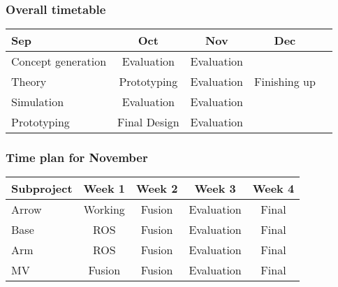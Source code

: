 \begin{frame}
    \frametitle{Overall timetable}
    \begin{table}
        \begin{tabular}{| l | c | c | c | c }
            
            Sep & Oct & Nov & Dec \\
            \hline \hline
            Concept generation & Evaluation & Evaluation &  \\ 
            \hline
            Theory & Prototyping & Evaluation & Finishing up \\
            \hline
            Simulation & Evaluation & Evaluation & \\
            \hline
            Prototyping & Final Design & Evaluation &  \\
            \hline
 
        \end{tabular}
    \end{table}    
\end{frame}

\begin{frame}

    \frametitle{Time plan for November}
    \begin{table}
        \begin{tabular}{l | c | c | c | c }
        Subproject & Week 1 & Week 2 & Week 3 & Week 4 \\
        \hline \hline
            Arrow & Working & Fusion & Evaluation & Final\\
            Base & ROS & Fusion & Evaluation & Final\\
            Arm  & ROS & Fusion & Evaluation & Final\\
            MV & Fusion & Fusion & Evaluation & Final
        \end{tabular}
    \end{table}
\end{frame}

